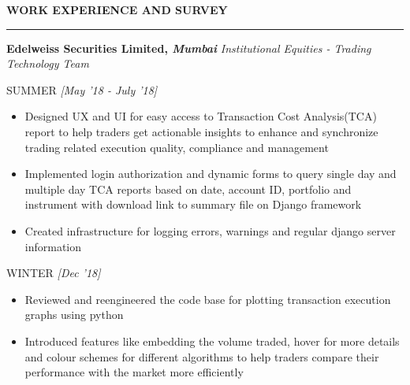 \documentclass[10 pt]{article}%
\begin{document}
\vspace*{4.2cm}

\begin{flushleft}\textbf{\large{WORK EXPERIENCE AND SURVEY}}\end{flushleft}
\vspace{-1mm}
\hrule
\vspace{1 pt}
{\flushleft \bf {\large{Edelweiss Securities Limited}}, \em{Mumbai}}%
\vspace{-0.8em}
{\flushleft \em{Institutional Equities - Trading Technology Team}}
\vspace{-5pt}
{\flushleft \textrm{SUMMER} \hfill {{{\em{[May '18 - July '18]}}}}
\vspace{-5pt}
\begin{itemize}[leftmargin=*]
    \setlength\itemsep{1.5pt}
    \setlength\parskip{1.5pt}
    \item Designed UX and UI for easy access to Transaction Cost Analysis(TCA) report to help traders get actionable insights to enhance and synchronize trading related execution quality, compliance and management
	\item Implemented login authorization and dynamic forms to query single day and multiple day TCA reports based on date, account ID, portfolio and instrument with download link to summary file on Django framework
	\item Created infrastructure for logging errors, warnings and regular django server information
\end{itemize}
	{\flushleft \textrm{WINTER} \hfill {{{\em{[Dec '18]}}}}}
\vspace{-5pt}
\begin{itemize}[leftmargin=*]
	\setlength\itemsep{1.5pt}
	\setlength\parskip{1.5pt}
	\item Reviewed and reengineered the code base for plotting transaction execution graphs using python
	\item Introduced features like embedding the volume traded, hover for more details and colour schemes for different algorithms to help traders compare their performance with the market more efficiently
\end{itemize}

}
\end{document}
